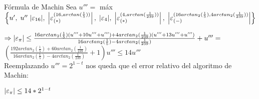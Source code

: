 \begin{subsection}{Fórmula de Machin}
	Sea $u''' =$ máx$\left\{ u',\;u''\;|\varepsilon _{16}|,\;\left|\varepsilon _{({*})}^{({16,arctan(\frac{1}{5})})}\right|,\;|\varepsilon _{4}|,\;\left|\varepsilon _{({*})}^{({4,arctan(\frac{1}{239})})}\right|,\;\left|\varepsilon _{({-})}^{({16arctan_2(\frac{1}{5}),4arctan_2(\frac{1}{239})})}\right|\right\}$\\
	
	\pa
	
	$\Rightarrow \left|\varepsilon _{\pi}\right| \leq \frac{16arctan_2(\frac{1}{5})(u''' + 10u''' + u''') + 4arctan_2(\frac{1}{239})(u''' + 13u''' + u''')}{16arctan_2(\frac{1}{5})-4arctan_2(\frac{1}{239})} + u''' =$\\
	
	$(\frac{192arctan_2(\frac{1}{5}) + 60arctan_2(\frac{1}{239})}{16arctan_2(\frac{1}{5})-4arctan_2(\frac{1}{239})} + 1) u''' \leq 14u'''$\\
	
	Reemplazando $u'''=2^{1-t}$ nos queda que el error relativo del algoritmo de Machin:
	
	$\left|\varepsilon _{\pi}\right| \leq 14*2^{1-t}$
	
	
\end{subsection}
